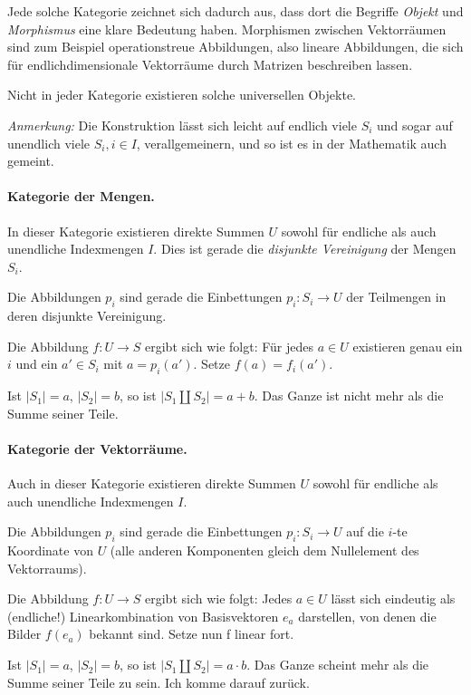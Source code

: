 \documentclass[11pt,a4paper]{article}
\begin{document}
Jede solche Kategorie zeichnet sich dadurch aus, dass dort die Begriffe
\emph{Objekt} und \emph{Morphismus} eine klare Bedeutung haben.  Morphismen
zwischen Vektorräumen sind zum Beispiel operationstreue Abbildungen, also
lineare Abbildungen, die sich für endlichdimensionale Vektorräume durch
Matrizen beschreiben lassen.

Nicht in jeder Kategorie existieren solche universellen Objekte.

\emph{Anmerkung:} Die Konstruktion lässt sich leicht auf endlich viele $S_i$
und sogar auf unendlich viele $S_i, i\in I$, verallgemeinern, und so ist es in
der Mathematik auch gemeint.

\paragraph{Kategorie der Mengen.}
In dieser Kategorie existieren direkte Summen $U$ sowohl für endliche als auch
unendliche Indexmengen $I$. Dies ist gerade die \emph{disjunkte Vereinigung}
der Mengen $S_i$.

Die Abbildungen $p_i$ sind gerade die Einbettungen $p_i: S_i \rightarrow U$
der Teilmengen in deren disjunkte Vereinigung.

Die Abbildung $f: U \rightarrow S$ ergibt sich wie folgt: Für jedes $a\in U$
existieren genau ein $i$ und ein $a'\in S_i$ mit $a=p_i(a')$. Setze
$f(a)=f_i(a')$.

Ist $|S_1| = a$, $|S_2| = b$, so ist $|S_1\coprod S_2| = a+b$.  Das Ganze ist
nicht mehr als die Summe seiner Teile.

\paragraph{Kategorie der Vektorräume.}
Auch in dieser Kategorie existieren direkte Summen $U$ sowohl für endliche als
auch unendliche Indexmengen $I$.

Die Abbildungen $p_i$ sind gerade die Einbettungen $p_i: S_i \rightarrow U$
auf die $i$-te Koordinate von $U$ (alle anderen Komponenten gleich dem
Nullelement des Vektorraums).

Die Abbildung $f: U \rightarrow S$ ergibt sich wie folgt: Jedes $a\in U$ lässt
sich eindeutig als (endliche!) Linearkombination von Basisvektoren $e_a$
darstellen, von denen die Bilder $f(e_a)$ bekannt sind. Setze nun f linear
fort.

Ist $|S_1| = a$, $|S_2| = b$, so ist $|S_1\coprod S_2| = a \cdot b$.  Das
Ganze scheint mehr als die Summe seiner Teile zu sein. Ich komme darauf
zurück.
\end{document}
